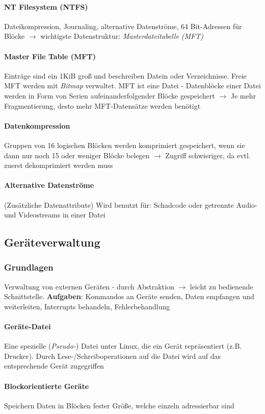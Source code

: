 \documentclass[10pt,a4paper,landscape]{article}
\begin{document}
\begin{multicols*}{3}
	\paragraph{NT Filesystem (NTFS)} Dateikompression, Journaling, alternative Datenströme, 64 Bit-Adressen für Blöcke $\rightarrow$ wichtigste Datenstruktur: \textit{Masterdateitabelle (MFT)} 
	\paragraph{Master File Table (MFT)} Einträge sind ein 1KiB groß und beschreiben Datein oder Verzeichnisse. Freie MFT werden mit \textit{Bitmap} verwaltet. MFT ist eine Datei - Datenblöcke einer Datei werden in Form von Serien aufeinanderfolgender Blöcke gespeichert $\rightarrow$ Je mehr Fragmentierung, desto mehr MFT-Datensätze werden benötigt
	\paragraph{Datenkompression} Gruppen von 16 logischen Blöcken werden komprimiert gespeichert, wenn sie dann nur noch 15 oder weniger Blöcke belegen $\rightarrow$ Zugriff schwieriger, da evtl. zuerst dekomprimiert werden muss
	\paragraph{Alternative Datenströme} (Zusätzliche Datenattribute) Wird benutzt für: Schadcode oder getrennte Audio- und Videostreams in einer Datei
	\subsection{Geräteverwaltung}
	\subsubsection{Grundlagen}
	Verwaltung von externen Geräten - durch Abstraktion $\rightarrow$ leicht zu bedienende Schnittstelle. \textbf{Aufgaben}: Kommandos an Geräte senden, Daten empfangen und weiterleiten, Interrupts behandeln, Fehlerbehandlung
	\paragraph{Geräte-Datei} Eine spezielle (\textit{Pseudo-}) Datei unter Linux, die ein Gerät repräsentiert (z.B. Drucker). Durch Lese-/Schreiboperationen auf die Datei wird auf das entsprechende Gerät zugegriffen
	\paragraph{Blockorientierte Geräte} Speichern Daten in Blöcken fester Größe, welche einzeln adressierbar sind

\end{multicols*}
\end{document}
